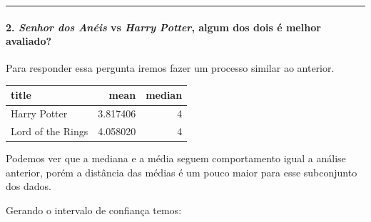 \documentclass[]{article}
\newenvironment{Shaded}{\begin{snugshade}}{\end{snugshade}}
\newcommand{\KeywordTok}[1]{\textcolor[rgb]{0.13,0.29,0.53}{\textbf{#1}}}
\newcommand{\DataTypeTok}[1]{\textcolor[rgb]{0.13,0.29,0.53}{#1}}
\newcommand{\StringTok}[1]{\textcolor[rgb]{0.31,0.60,0.02}{#1}}
\newcommand{\OperatorTok}[1]{\textcolor[rgb]{0.81,0.36,0.00}{\textbf{#1}}}
\newcommand{\NormalTok}[1]{#1}
\let\oldparagraph\paragraph
\renewcommand{\paragraph}[1]{\oldparagraph{#1}\mbox{}}
\begin{document}
\begin{center}\rule{0.5\linewidth}{\linethickness}\end{center}

\paragraph{\texorpdfstring{2. \textbf{\emph{Senhor dos Anéis} vs
\emph{Harry Potter}, algum dos dois é melhor
avaliado?}}{2. Senhor dos Anéis vs Harry Potter, algum dos dois é melhor avaliado?}}\label{senhor-dos-anuxe9is-vs-harry-potter-algum-dos-dois-uxe9-melhor-avaliado}

Para responder essa pergunta iremos fazer um processo similar ao
anterior.

\begin{Shaded}
\end{Shaded}

\begin{longtable}[]{@{}lrr@{}}
\toprule
title & mean & median\tabularnewline
\midrule
\endhead
Harry Potter & 3.817406 & 4\tabularnewline
Lord of the Rings & 4.058020 & 4\tabularnewline
\bottomrule
\end{longtable}

Podemos ver que a mediana e a média seguem comportamento igual a análise
anterior, porém a distância das médias é um pouco maior para esse
subconjunto dos dados.

Gerando o intervalo de confiança temos:
\end{document}
